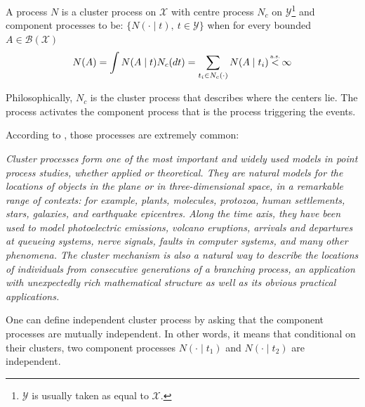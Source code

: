 \documentclass[11pt]{book}
\begin{document}
\begin{definition}
\label{def:cluster_process}
A process $ N$ is a cluster process on $\mathcal X$ with centre process $ N_c $ on $\mathcal Y$\footnote{$\mathcal Y$ is usually taken as equal to $\mathcal X$.} and component processes to be: $\{N( \cdot \mid t ), \ t \in \mathcal Y \}$ when for every bounded $A \in \mathcal B( \mathcal X )$
\begin{equation}
N(A) = \int N(A \mid t  ) N_c (dt) = \sum_{ t_i \in N_c(\cdot) } N(A \mid t_i )  \stackrel{\mathclap{\mbox{\normalfont\tiny a.s.}}}{<} \infty 
\end{equation}

Philosophically, $N_c$ is the cluster process that describes where the centers lie. The process activates the component process that is the process triggering the events.


\end{definition}
According to \cite{daley}, those processes are extremely common:

\textit{Cluster processes form one of the most important and widely used models in point process studies, whether applied or theoretical. They are natural models for the locations of objects in the plane or in three-dimensional space, in a remarkable range of contexts: for example, plants, molecules, protozoa, human settlements, stars, galaxies, and earthquake epicentres. Along the time axis, they have been used to model photoelectric emissions, volcano eruptions, arrivals and departures at queueing systems, nerve signals, faults in computer systems, and many other phenomena. The cluster mechanism is also a natural way to describe the locations of individuals from consecutive generations of a branching process, an application with unexpectedly rich mathematical structure as well as its obvious practical applications.}

\begin{remarque}
One can define independent cluster process by asking that the component processes are mutually independent. In other words, it means that conditional on their clusters, two component processes $N(\cdot \mid t_1)$ and $N(\cdot \mid t_2)$ are independent.
\end{remarque}
\end{document}

